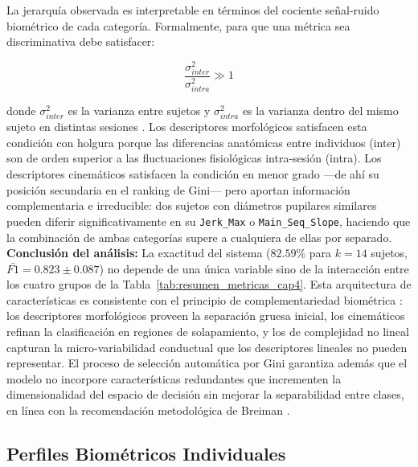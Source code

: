 La jerarquía observada es interpretable en términos del cociente
señal-ruido biométrico de cada categoría.
Formalmente, para que
una métrica sea discriminativa debe satisfacer:

\begin{equation}
	\frac{\sigma^2_{inter}}{\sigma^2_{intra}} \gg 1
	\label{eq:snr_biometrico}
\end{equation}

donde $\sigma^2_{inter}$ es la varianza entre sujetos y
$\sigma^2_{intra}$ es la varianza dentro del mismo sujeto en
distintas sesiones \cite{komogortsev2010}.
Los descriptores
morfológicos satisfacen esta condición con holgura porque las
diferencias anatómicas entre individuos (inter) son de orden
superior a las fluctuaciones fisiológicas intra-sesión (intra).
Los descriptores cinemáticos satisfacen la condición en menor
grado ---de ahí su posición secundaria en el ranking de Gini---
pero aportan información complementaria e irreducible: dos sujetos
con diámetros pupilares similares pueden diferir significativamente
en su \texttt{Jerk\_Max} o \texttt{Main\_Seq\_Slope}, haciendo que
la combinación de ambas categorías supere a cualquiera de ellas por
separado.
\noindent\textbf{Conclusión del análisis:}
La exactitud del sistema ($82.59\%$ para $k=14$ sujetos,
$\bar{F1} = 0.823 \pm 0.087$) no depende de una única variable
sino de la interacción entre los cuatro grupos de la
Tabla~\ref{tab:resumen_metricas_cap4}.
Esta arquitectura de
características es consistente con el principio de complementariedad
biométrica \cite{duchowski2017}: los descriptores morfológicos
proveen la separación gruesa inicial, los cinemáticos refinan la
clasificación en regiones de solapamiento, y los de complejidad
no lineal capturan la micro-variabilidad conductual que los
descriptores lineales no pueden representar.
El proceso de selección
automática por Gini garantiza además que el modelo no incorpore
características redundantes que incrementen la dimensionalidad del
espacio de decisión sin mejorar la separabilidad entre clases,
en línea con la recomendación metodológica de Breiman \cite{breiman2001}.
\subsection{Perfiles Biométricos Individuales}

